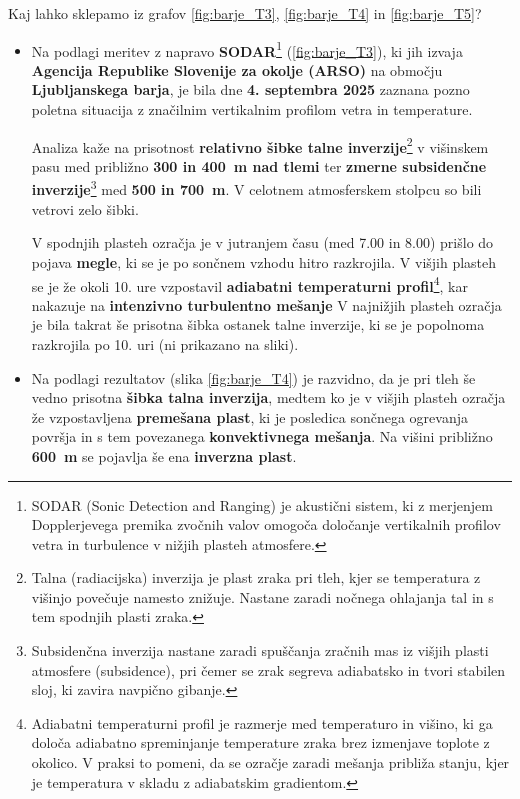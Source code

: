 \documentclass[mat2, tisk]{fmfdelo}
\begin{document}
Kaj lahko sklepamo iz grafov \ref{fig:barje_T3}, \ref{fig:barje_T4} in \ref{fig:barje_T5}?
\begin{itemize}
  \item Na podlagi meritev z napravo \textbf{SODAR}\footnote{SODAR (Sonic Detection and Ranging) je akustični sistem, ki z merjenjem Dopplerjevega premika zvočnih valov omogoča določanje vertikalnih profilov vetra in turbulence v nižjih plasteh atmosfere.} 
  (\autoref{fig:barje_T3}), ki jih izvaja \textbf{Agencija Republike Slovenije za okolje (ARSO)} na območju \textbf{Ljubljanskega barja}, 
  je bila dne \textbf{4. septembra 2025} zaznana pozno poletna situacija z značilnim vertikalnim profilom vetra in temperature. 
  
  Analiza kaže na prisotnost \textbf{relativno šibke talne inverzije}\footnote{Talna (radiacijska) inverzija je plast zraka pri tleh, kjer se temperatura z višinjo povečuje namesto znižuje. Nastane zaradi nočnega ohlajanja tal in s tem spodnjih plasti zraka.} 
  v višinskem pasu med približno \textbf{300 in 400~m nad tlemi} ter 
  \textbf{zmerne subsidenčne inverzije}\footnote{Subsidenčna inverzija nastane zaradi spuščanja zračnih mas iz višjih plasti atmosfere (subsidence), pri čemer se zrak segreva adiabatsko in tvori stabilen sloj, ki zavira navpično gibanje.} 
  med \textbf{500 in 700~m}. 
  V celotnem atmosferskem stolpcu so bili vetrovi zelo šibki. 
  
  V spodnjih plasteh ozračja je v {jutranjem času (med 7.00 in 8.00)} prišlo do pojava \textbf{megle}, 
  ki se je po sončnem vzhodu hitro razkrojila. 
  V višjih plasteh se je že okoli {10. ure} vzpostavil \textbf{adiabatni temperaturni profil}\footnote{Adiabatni temperaturni profil je razmerje med temperaturo in višino, ki ga določa adiabatno spreminjanje temperature zraka brez izmenjave toplote z okolico. V praksi to pomeni, da se ozračje zaradi mešanja približa stanju, kjer je temperatura v skladu z adiabatskim gradientom.}, 
  kar nakazuje na \textbf{intenzivno turbulentno mešanje} 
  V najnižjih plasteh ozračja je bila takrat še prisotna šibka ostanek talne inverzije, 
  ki se je popolnoma razkrojila po {10. uri} (ni prikazano na sliki).
  
 \item Na podlagi rezultatov (slika \ref{fig:barje_T4}) je razvidno, da je pri tleh še vedno prisotna 
\textbf{šibka talna inverzija}, medtem ko je v višjih plasteh ozračja že vzpostavljena 
\textbf{premešana plast}, ki je posledica {sončnega ogrevanja površja} in s tem povezanega 
\textbf{konvektivnega mešanja}. 
Na višini približno \textbf{600~m} se pojavlja še ena \textbf{inverzna plast}. 


\end{itemize}
\end{document}
